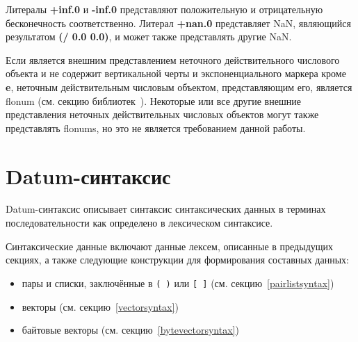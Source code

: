 Литералы {\cf\bfseries +inf.0} и {\cf\bfseries -inf.0} представляют положительную и
отрицательную бесконечность соответственно. Литерал {\cf\bfseries +nan.0} представляет NaN,
являющийся результатом {\cf\bfseries(/ 0.0 0.0)}, и может также представлять другие NaN.

Если  является внешним представлением неточного действительного числового объекта и не
содержит вертикальной черты и экспоненциального маркера кроме {\cf\bfseries e}, неточным
действительным числовым объектом, представляющим его, является flonum (см. секцию
библиотек~). Некоторые или все другие внешние представления
неточных действительных числовых объектов могут также представлять flonums, но это не является
требованием данной работы.

\section{Datum-синтаксис}
\label{datumsyntaxsection}

Datum-синтаксис описывает синтаксис синтаксических данных
в терминах последовательности  как определено в лексическом
синтаксисе.

Синтаксические данные включают данные лексем, описанные в предыдущих секциях, а также
следующие конструкции для формирования составных данных:
%
\begin{itemize}
\item пары и списки, заключённые в \verb|( )| или \verb|[ ]| (см.
  секцию~\ref{pairlistsyntax})
\item векторы (см. секцию~\ref{vectorsyntax})
\item байтовые векторы (см. секцию~\ref{bytevectorsyntax})
\end{itemize}

